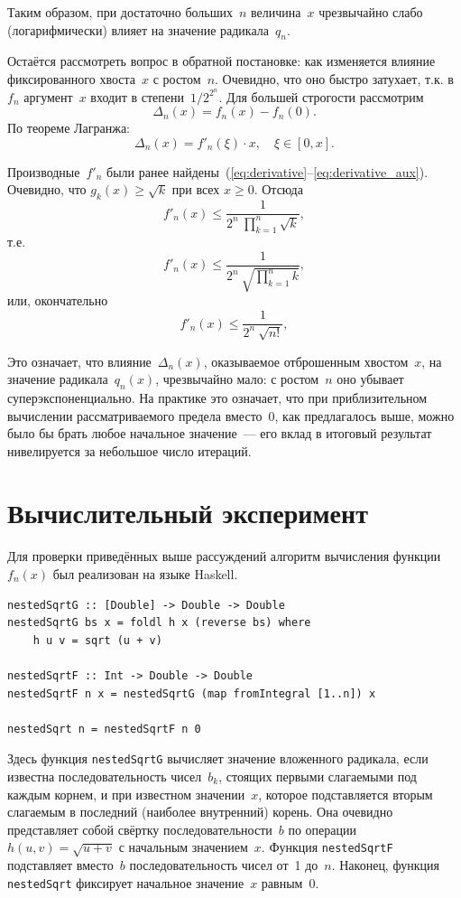 \documentclass[12pt]{article}
\begin{document}
Таким образом, при достаточно больших~\(n\) величина~\(x\) чрезвычайно слабо (логарифмически) влияет на значение радикала~\(q_n\).

Остаётся рассмотреть вопрос в обратной постановке: как изменяется влияние фиксированного хвоста~\(x\) с ростом~\(n\). Очевидно, что оно быстро затухает, т.к.
в~\(f_n\) аргумент~\(x\) входит в степени~\(1/2^{2^n}\). Для большей строгости рассмотрим
\[
\Delta_n(x) = f_n(x) - f_n(0) .
\]
По теореме Лагранжа:
\[
\Delta_n(x) = f'_n(\xi) \cdot x, \quad \xi \in [0, x] .
\]

Производные~\(f'_n\) были ранее найдены~(\ref{eq:derivative}--\ref{eq:derivative_aux}). Очевидно, что \(g_k(x) \geqslant \sqrt{k}\) при всех \(x \geqslant 0\).
Отсюда
\[
    f'_n(x) \leqslant \frac{1}{2^n \ \prod_{k=1}^{n}\sqrt{k}} ,
\]
т.е.
\[
    f'_n(x) \leqslant \frac{1}{2^n \ \sqrt{\prod_{k=1}^{n}k}} ,
\]
или, окончательно
\[
    f'_n(x) \leqslant \frac{1}{2^n \ \sqrt{n!}} ,
\]

Это означает, что влияние~\(\Delta_n(x)\), оказываемое отброшенным хвостом~\(x\), на значение радикала~\(q_n(x)\), чрезвычайно мало: с
ростом~\(n\) оно убывает суперэкспоненциально. На практике это означает, что при приблизительном вычислении рассматриваемого предела вместо~0, как предлагалось
выше, можно было бы брать любое начальное значение~--- его вклад в итоговый результат нивелируется за небольшое число итераций.

\section{Вычислительный эксперимент}

Для проверки приведённых выше рассуждений алгоритм вычисления функции~\(f_n(x)\) был реализован на языке Haskell.
\begin{lstlisting}
nestedSqrtG :: [Double] -> Double -> Double
nestedSqrtG bs x = foldl h x (reverse bs) where
    h u v = sqrt (u + v)

nestedSqrtF :: Int -> Double -> Double
nestedSqrtF n x = nestedSqrtG (map fromIntegral [1..n]) x

nestedSqrt n = nestedSqrtF n 0
\end{lstlisting}

Здесь функция \lstinline{nestedSqrtG} вычисляет значение вложенного радикала, если известна последовательность чисел~\(b_k\), стоящих первыми слагаемыми под каждым
корнем, и при известном значении~\(x\), которое подставляется вторым слагаемым в последний (наиболее внутренний) корень. Она очевидно представляет собой свёртку
последовательности~\(b\) по операции \(h(u, v) = \sqrt{u + v}\) с начальным значением~\(x\).
Функция \lstinline{nestedSqrtF} подставляет вместо~\(b\) последовательность чисел от~1 до~\(n\).
Наконец, функция \lstinline{nestedSqrt} фиксирует начальное значение~\(x\) равным~0.
\end{document}
